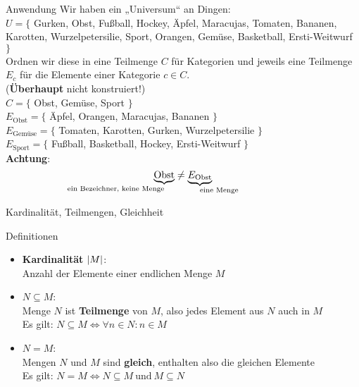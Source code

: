 \begin{frame}{Anwendung}
	Wir haben ein „Universum“ an Dingen:\\ 
	$U = \{ $ Gurken, Obst, Fußball, Hockey, Äpfel, Maracujas, Tomaten, Bananen, Karotten, Wurzelpetersilie, Sport,  Orangen, Gemüse, Basketball, Ersti-Weitwurf $ \} $  \\[0.5em]
	
	\pause
	Ordnen wir diese in eine Teilmenge $C$ für Kategorien und jeweils eine Teilmenge $E_c$ für die Elemente einer Kategorie $c \in C$. \\ {\small (\textbf{Überhaupt} nicht konstruiert!)} \\[0.5em]
	
	\pause
	$C = \{$ Obst, Gemüse, Sport $\}$ \\[0.3em]
	$E_{\text{Obst}} = \{$ Äpfel, Orangen, Maracujas, Bananen $\}$ \\
	$E_{\text{Gemüse}} = \{$ Tomaten, Karotten, Gurken, Wurzelpetersilie $\}$ \\
	$E_{\text{Sport}} = \{$ Fußball, Basketball, Hockey, Ersti-Weitwurf $\}$ \\
	
	\vspace{.5\baselineskip}
	\Large \alert{
			\textbf{Achtung}: 
			$$\underbrace{\text{Obst}}_{\mathllap{\text{ein Bezeichner, keine Menge}}}
			 \neq 
			\underbrace{E_{\text{Obst}}}_{\mathrlap{\text{eine Menge}}}$$
	}
	
\end{frame}

\begin{frame}{Kardinalität, Teilmengen, Gleichheit}
	
	\begin{block}{Definitionen}  \vspace{-.4\baselineskip}
		\begin{itemize}
			\item \textbf{Kardinalität} $\left\lvert M \right\rvert$: \\
			Anzahl der Elemente einer endlichen Menge $M$ \\
			\pause
			\item $N \subseteq M$: \\
			Menge $N$ ist \textbf{Teilmenge} von $M$, also jedes Element aus $N$ auch in $M$ \\
			Es gilt: \qqquad $ N \subseteq M \iff \forall n \in N : n \in M$
			\pause
			\item $N = M$: \\
			Mengen $N$ und $M$ sind \textbf{gleich}, enthalten also die gleichen Elemente \\
			Es gilt: \qqquad $ N = M \iff N \subseteq M \ \text{und} \ M \subseteq N$
		\end{itemize}
	\end{block} 
\end{frame}

